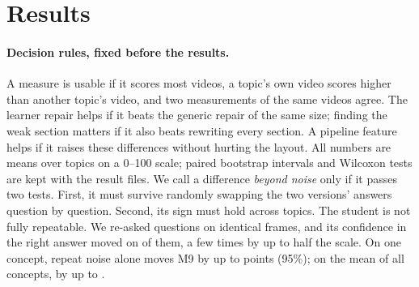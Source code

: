 \section{Results}\label{sec:results}

\paragraph{Decision rules, fixed before the results.} A measure is usable if it scores most videos, a topic's own
video scores higher than another topic's video, and two measurements of the same videos agree. The learner repair
helps if it beats the generic repair of the same size; finding the weak section matters if it also beats rewriting
every section. A pipeline feature helps if it raises these differences without hurting the layout. All numbers are
means over topics on a 0--100 scale; paired bootstrap intervals and Wilcoxon tests are kept with the result files.
We call a difference \emph{beyond noise} only if it passes two tests. First, it must survive randomly swapping the two
versions' answers question by question. Second, its sign must hold across topics. The student is not fully
repeatable. We re-asked \NMRepeatN{} questions on identical frames, and its confidence in the right answer moved on
\NMRepeatMoved{} of them, a few times by up to half the scale. On one concept, repeat noise alone moves M9 by up to
\NMFloorOne{} points (95\%); on the mean of all concepts, by up to \NMFloorAll{}.


